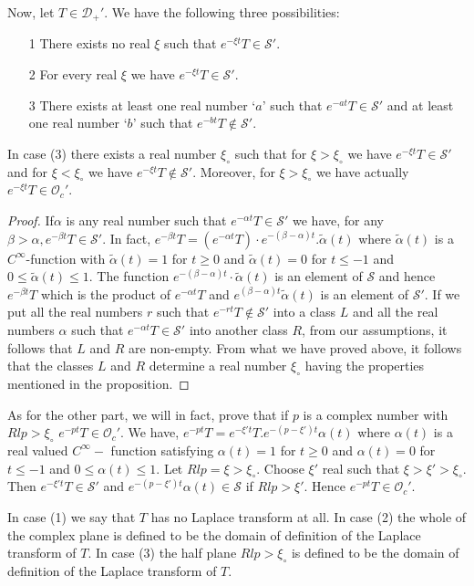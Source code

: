 Now, let $T \in \mathscr{D}_+'$. We have the following three possibilities:
\begin{itemize}
\item [1] There exists no real $\xi$ such that $e^{-\xi t} T 
\in\mathscr{S}'$.
\item [2] For every real $\xi$ we have $e^{-\xi t}T\in \mathscr{S}'$.
\item [3] There exists at least one real number `$a$' such that
 $e^{-at}T\in \mathscr{S}'$ and at least one real number `$b$' such
  that $e^{-bt}T\notin \mathscr{S}'$.
\end{itemize}
\begin{prop}\label{chap8:prop8.4}
In case (3) there exists a real number $\xi_\circ$ such that for $\xi
> \xi_\circ$ we have $e^{-\xi t}T\in \mathscr{S}'$ and for $\xi <
\xi_\circ$ we have $e^{-\xi t} T\notin \mathscr{S}'$. Moreover, for $\xi
> \xi_\circ$ we have actually $e^{-\xi t} T \in \mathscr{O}_c'$. 
\end{prop}

\begin{proof}
If\pageoriginale $\alpha$ is any real number such that $e^{-\alpha
  t}T\in \mathscr{S}'$ we have, for any $\beta > \alpha, e^{-\beta
  t}T\in \mathscr{S}'$. In fact, $e^{-\beta t}T=(e^{-\alpha
  t}T)\cdot e^{-(\beta -\alpha)t}.\tilde{\alpha}(t)$ where
$\tilde{\alpha}(t)$ is a $C^{\infty}$-function with $\tilde{\alpha}
 (t)=1$ for $t \geq 0$ and $\tilde{\alpha}(t) = 0$ for $t \leq - 1$
and $0 \leq \tilde{\alpha}(t) \leq 1$. The function $e^{-(\beta -
  \alpha)t}\cdot \tilde{\alpha}(t)$ is an element of $\mathscr{S}$ and
hence $e^{-\beta t}T$ which is the product of $e^{-\alpha t}T$ and
$e^{(\beta - \alpha)t}\tilde{\alpha}(t)$ is an element of
 $\mathscr{S}'$. If we put all the real numbers $r$ such that
 $e^{-rt} T \notin \mathscr{S}'$ into a class $L$ and all the real
 numbers $\alpha$ such that $e^{-\alpha t}T \in \mathscr{S}'$ into
 another class $R$, from our assumptions, it follows that $L$ and $R$
 are non-empty. From what we have proved above, it follows that the
 classes $L$ and $R$ determine a real number $\xi_\circ$ having the
 properties mentioned in the proposition.    
\end{proof}
As for the other part, we will in fact, prove that if $p$ is a complex
number with $Rl p > \xi_\circ$ $e^{-pt}T\in \mathscr{O}_c'$. We have,
$e^{-pt} T = e^{-\xi't} T.e^{-(p-\xi')t} \alpha (t)$ where $\alpha
(t)$ is a real valued $C^\infty -$ function satisfying $\alpha (t) =
1$ for $t \geq 0$ and $\alpha (t) = 0$ for $t \leq -1$ and $0 \leq
\alpha(t) \leq 1$. Let $Rl p = \xi > \xi_\circ$. Choose $\xi'$ real
such that $\xi > \xi' > \xi_\circ$. Then $e^{-\xi' t} T \in
\mathscr{S}'$ and $e^{-(p-\xi')t}\alpha (t) \in \mathscr{S}$ if $Rl p
> \xi'$. Hence $e^{-pt}T \in \mathscr{O}_c'$.
\begin{definition}\label{chap8:def8.3}
In case (1) we say that $T$ has no Laplace transform at all. In case
(2) the whole of the complex plane is defined to be the domain of
definition of the Laplace transform of $T$. In case (3) the half plane
$Rl p > \xi_\circ$ is defined to be the domain of definition of the
Laplace transform of $T$.
\end{definition}

